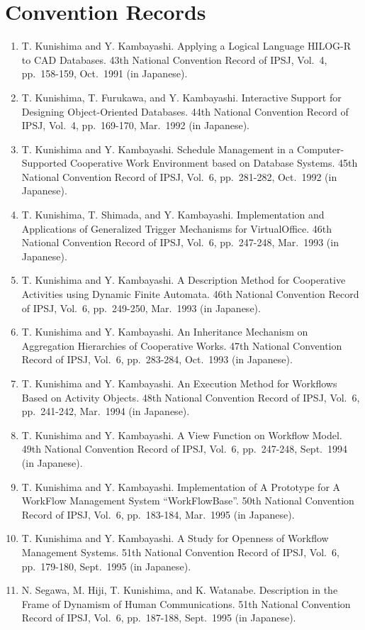 \section*{Convention Records}
\begin{enumerate}
 \item T. Kunishima and Y. Kambayashi.
       Applying a Logical Language {HILOG-R} to {CAD} Databases.
       43th National Convention Record of IPSJ, Vol.\ 4, pp.\ 158-159,
       Oct.\ 1991 (in Japanese).
 \item T. Kunishima, T. Furukawa, and Y. Kambayashi.
       Interactive Support for Designing Object-Oriented Databases.
       44th National Convention Record of IPSJ, Vol.\ 4, pp.\ 169-170,
       Mar.\ 1992 (in Japanese).
 \item T. Kunishima and Y. Kambayashi.
       Schedule Management in a Computer-Supported Cooperative Work
       Environment based on Database Systems.
       45th National Convention Record of IPSJ, Vol.\ 6, pp.\ 281-282,
       Oct.\ 1992 (in Japanese).
 \item T. Kunishima, T. Shimada, and Y. Kambayashi.
       Implementation and Applications of Generalized Trigger
       Mechanisms for VirtualOffice.
       46th National Convention Record of IPSJ, Vol.\ 6, pp.\ 247-248,
       Mar.\ 1993 (in Japanese).
 \item T. Kunishima and Y. Kambayashi.
       A Description Method for Cooperative Activities using Dynamic
       Finite Automata.
       46th National Convention Record of IPSJ, Vol.\ 6, pp.\ 249-250,
       Mar.\ 1993 (in Japanese).
 \item T. Kunishima and Y. Kambayashi.
       An Inheritance Mechanism on Aggregation Hierarchies of
       Cooperative Works.
       47th National Convention Record of IPSJ, Vol.\ 6, pp.\ 283-284,
       Oct.\ 1993 (in Japanese).
 \item T. Kunishima and Y. Kambayashi.
       An Execution Method for Workflows Based on Activity Objects.
       48th National Convention Record of IPSJ, Vol.\ 6, pp.\ 241-242,
       Mar.\ 1994 (in Japanese).
 \item T. Kunishima and Y. Kambayashi.
       A View Function on Workflow Model.
       49th National Convention Record of IPSJ, Vol.\ 6, pp.\ 247-248,
       Sept.\ 1994 (in Japanese).
 \item T. Kunishima and Y. Kambayashi.
       Implementation of A Prototype for A WorkFlow Management System
       ``WorkFlowBase''.
       50th National Convention Record of IPSJ, Vol.\ 6, pp.\ 183-184,
       Mar.\ 1995 (in Japanese).
 \item T. Kunishima and Y. Kambayashi.
       A Study for Openness of Workflow Management Systems.
       51th National Convention Record of IPSJ, Vol.\ 6, pp.\ 179-180,
       Sept.\ 1995 (in Japanese).
 \item N. Segawa, M. Hiji, T. Kunishima, and K. Watanabe.
       Description in the Frame of Dynamism of Human Communications.
       51th National Convention Record of IPSJ, Vol.\ 6, pp.\ 187-188,
       Sept.\ 1995 (in Japanese).
\end{enumerate}